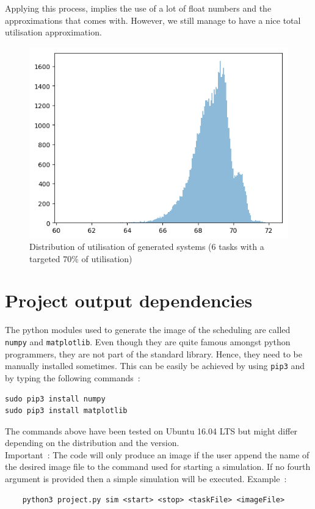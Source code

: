 \documentclass[a4paper,11pt]{article}
\begin{document}
  Applying this process, implies the use of a lot of float numbers and the approximations that comes with. However, we still manage to have a nice total utilisation approximation.
  \begin{figure}[h!]
    \centering
    \includegraphics[scale=0.7]{img/distribution.png}
    \caption{Distribution of utilisation of generated systems (6 tasks with a targeted $70\%$ of utilisation)}
  \end{figure}

\section{Project output dependencies}
  \label{sec:output-dependencies}
  The python modules used to generate the image of the scheduling are called \verb|numpy| and \verb|matplotlib|. Even though they are quite famous amongst python programmers, they are not part of the standard library. Hence, they need to be manually installed sometimes. This can be easily be achieved by using \verb|pip3| and by typing the following commands~:
  \begin{verbatim}
sudo pip3 install numpy
sudo pip3 install matplotlib
  \end{verbatim}
  The commands above have been tested on Ubuntu 16.04 LTS but might differ depending on the distribution and the version.\\
  
  \noindent Important~: The code will only produce an image if the user append the name of the desired image file to the command used for starting a simulation. If no fourth argument is provided then a simple simulation will be executed. Example~:
  \begin{verbatim}
    python3 project.py sim <start> <stop> <taskFile> <imageFile>
  \end{verbatim}
  
\end{document}
